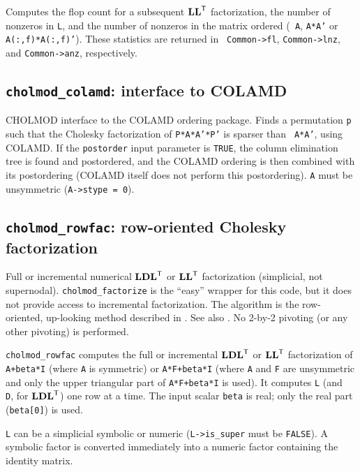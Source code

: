 \documentclass[11pt]{article}
\newcommand{\m}[1]{{\bf{#1}}}       %
\newcommand{\tr}{^{\sf T}}          %
\begin{document}
Computes the flop count for a subsequent $\m{LL}\tr$ factorization, the number
of nonzeros in {\tt L}, and the number of nonzeros in the matrix ordered ({\tt
A}, {\tt A*A'} or {\tt A(:,f)*A(:,f)'}).  These statistics are returned in {\tt
Common->fl}, {\tt Common->lnz}, and {\tt Common->anz}, respectively.

\subsection{{\tt cholmod\_colamd}: interface to COLAMD}


CHOLMOD interface to the COLAMD ordering package.  Finds a permutation {\tt p}
such that the Cholesky factorization of {\tt P*A*A'*P'} is sparser than {\tt
A*A'}, using COLAMD.  If the {\tt postorder} input parameter is {\tt TRUE}, the
column elimination tree is found and postordered, and the COLAMD ordering is
then combined with its postordering (COLAMD itself does not perform this
postordering).  {\tt A} must be unsymmetric ({\tt A->stype = 0}).

\subsection{{\tt cholmod\_rowfac}: row-oriented Cholesky factorization}


Full or incremental numerical $\m{LDL}\tr$ or $\m{LL}\tr$ factorization
(simplicial, not supernodal).  {\tt cholmod\_factorize} is the ``easy'' wrapper
for this code, but it does not provide access to incremental factorization.
The algorithm is the row-oriented, up-looking method described in
\cite{Davis05}.  See also \cite{Liu86c}.  No 2-by-2 pivoting (or any other
pivoting) is performed.

{\tt cholmod\_rowfac} computes the full or incremental $\m{LDL}\tr$ or
$\m{LL}\tr$ factorization of {\tt A+beta*I} (where {\tt A} is symmetric) or
{\tt A*F+beta*I} (where {\tt A} and {\tt F} are unsymmetric and only the upper
triangular part of {\tt A*F+beta*I} is used).  It computes {\tt L} (and {\tt
D}, for $\m{LDL}\tr$) one row at a time.  The input scalar {\tt beta} is real;
only the real part ({\tt beta[0]}) is used.

{\tt L} can be a simplicial symbolic or numeric ({\tt L->is\_super} must be
{\tt FALSE}).  A symbolic factor is converted immediately into a numeric factor
containing the identity matrix.
\end{document}
